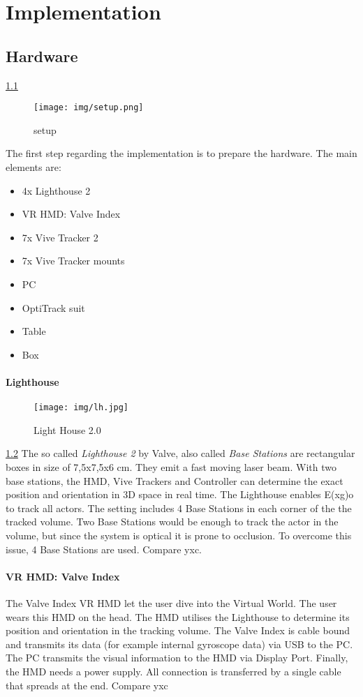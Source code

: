 \chapter{Implementation}

\section{Hardware}
\ref{fig:setup}
\begin{figure}
	\centering
	\texttt{[image: img/setup.png]}
	\caption{setup}
	\label{fig:setup}
\end{figure}
The first step regarding the implementation is to prepare the hardware. The main elements are:
\begin{itemize}
	\item 4x Lighthouse 2
	\item VR HMD: Valve Index
	\item 7x Vive Tracker 2
	\item 7x Vive Tracker mounts
	\item PC
	\item OptiTrack suit
	\item Table
	\item Box
\end{itemize}
\subsubsection{Lighthouse}
\begin{figure}
	\centering
	\texttt{[image: img/lh.jpg]}
	\caption{Light House 2.0}
	\label{fig:lh}
\end{figure}
\ref{fig:lh}
The so called \textit{Lighthouse 2} by Valve, also called \textit{Base Stations} are rectangular boxes in size of 7,5x7,5x6 cm. They emit a fast moving laser beam. With two base stations, the HMD, Vive Trackers and Controller can determine the exact position and orientation in 3D space in real time. The Lighthouse enables E(x\textbar g)o to track all actors. The setting includes 4 Base Stations in each corner of the the tracked volume. Two Base Stations would be enough to track the actor in the volume, but since the system is optical it is prone to occlusion. To overcome this issue, 4 Base Stations are used. Compare yxc.
\subsubsection{VR HMD: Valve Index}
The Valve Index VR HMD let the user dive into the Virtual World. The user wears this HMD on the head. The HMD utilises the Lighthouse to determine its position and orientation in the tracking volume. The Valve Index is cable bound and transmits its data (for example internal gyroscope data) via USB to the PC. The PC transmits the visual information to the HMD via Display Port. Finally, the HMD needs a power supply. All connection is transferred by a single cable that spreads at the end. Compare yxc

